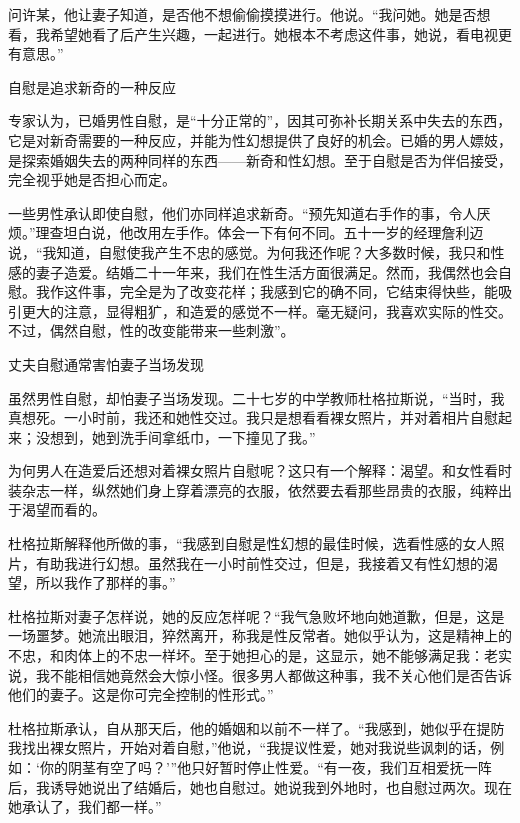 \documentclass[12pt,UTF8]{ctexbook}
\begin{document}
问许某，他让妻子知道，是否他不想偷偷摸摸进行。他说。“我问她。她是否想看，我希望她看了后产生兴趣，一起进行。她根本不考虑这件事，她说，看电视更有意思。”





自慰是追求新奇的一种反应


专家认为，已婚男性自慰，是“十分正常的”，因其可弥补长期关系中失去的东西，它是对新奇需要的一种反应，并能为性幻想提供了良好的机会。已婚的男人嫖妓，是探索婚姻失去的两种同样的东西——新奇和性幻想。至于自慰是否为伴侣接受，完全视乎她是否担心而定。

一些男性承认即使自慰，他们亦同样追求新奇。“预先知道右手作的事，令人厌烦。”理查坦白说，他改用左手作。体会一下有何不同。五十一岁的经理詹利迈说，“我知道，自慰使我产生不忠的感觉。为何我还作呢？大多数时候，我只和性感的妻子造爱。结婚二十一年来，我们在性生活方面很满足。然而，我偶然也会自慰。我作这件事，完全是为了改变花样；我感到它的确不同，它结束得快些，能吸引更大的注意，显得粗犷，和造爱的感觉不一样。毫无疑问，我喜欢实际的性交。不过，偶然自慰，性的改变能带来一些刺激”。





丈夫自慰通常害怕妻子当场发现


虽然男性自慰，却怕妻子当场发现。二十七岁的中学教师杜格拉斯说，“当时，我真想死。一小时前，我还和她性交过。我只是想看看裸女照片，并对着相片自慰起来；没想到，她到洗手间拿纸巾，一下撞见了我。”

为何男人在造爱后还想对着裸女照片自慰呢？这只有一个解释：渴望。和女性看时装杂志一样，纵然她们身上穿着漂亮的衣服，依然要去看那些昂贵的衣服，纯粹出于渴望而看的。

杜格拉斯解释他所做的事，“我感到自慰是性幻想的最佳时候，选看性感的女人照片，有助我进行幻想。虽然我在一小时前性交过，但是，我接着又有性幻想的渴望，所以我作了那样的事。”

杜格拉斯对妻子怎样说，她的反应怎样呢？“我气急败坏地向她道歉，但是，这是一场噩梦。她流出眼泪，猝然离开，称我是性反常者。她似乎认为，这是精神上的不忠，和肉体上的不忠一样坏。至于她担心的是，这显示，她不能够满足我：老实说，我不能相信她竟然会大惊小怪。很多男人都做这种事，我不关心他们是否告诉他们的妻子。这是你可完全控制的性形式。”

杜格拉斯承认，自从那天后，他的婚姻和以前不一样了。“我感到，她似乎在提防我找出裸女照片，开始对着自慰，”他说，“我提议性爱，她对我说些讽刺的话，例如：‘你的阴茎有空了吗？’”他只好暂时停止性爱。“有一夜，我们互相爱抚一阵后，我诱导她说出了结婚后，她也自慰过。她说我到外地时，也自慰过两次。现在她承认了，我们都一样。”
\end{document}
